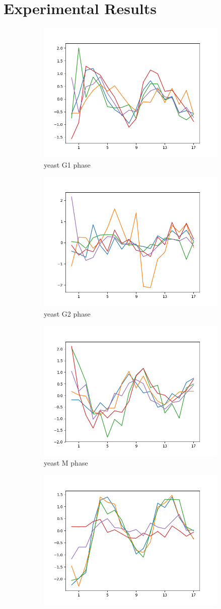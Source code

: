 \section{Experimental Results}
\label{sec:exp}
\begin{figure}[t]
	\centering
	\begin{subfigure}{0.4\columnwidth}
		\centering
		\includegraphics[width=\columnwidth, height=4 cm]{Figures/yeast_G1.png}
		\caption{yeast G1 phase}
	\end{subfigure}%
	\begin{subfigure}{0.4\columnwidth}
		\centering
		\includegraphics[width=\columnwidth, height=4 cm]{Figures/yeast_G2.png}
		\caption{yeast G2 phase}
	\end{subfigure}%
	\begin{subfigure}{0.4\columnwidth}
		\centering
		\includegraphics[width=\columnwidth, height=4 cm]{Figures/yeast_M.png}
		\caption{yeast M phase}
	\end{subfigure}
		\begin{subfigure}{0.4\columnwidth}
		\centering
		\includegraphics[width=\columnwidth, height=4 cm]{Figures/yeast_S.png}

\end{subfigure}
\end{figure}
